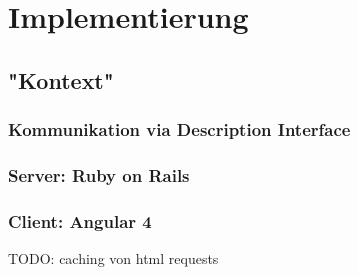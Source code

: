 \section{Implementierung}
\label{sec:implementation-analysis}

\subsection{"Kontext"}



\subsubsection{Kommunikation via Description Interface}



\subsubsection{Server: Ruby on Rails}



\subsubsection{Client: Angular 4}

TODO: caching von html requests

